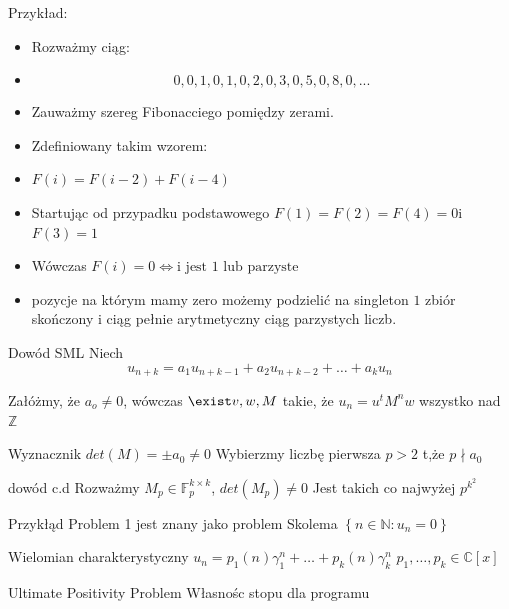 \documentclass{beamer}
\theoremstyle{definition}
\begin{document}
\begin{frame}{Przykład:}
\begin{itemize}
   \item  Rozważmy ciąg: 
   \item  $$ 0, 0, 1, 0, 1, 0, 2, 0, 3, 0, 5, 0, 8, 0, ...$$
    \item      Zauważmy szereg Fibonacciego pomiędzy zerami. 
    \item  Zdefiniowany takim wzorem:
    \item  $F(i) = F(i-2) + F(i-4)$
    \item  Startując od przypadku podstawowego $F(1) = F(2) = F(4) = 0$i $F(3) = 1$
    \item  Wówczas $F(i) = 0 \iff \text{i jest 1 lub parzyste} $  
    \item pozycje na którym mamy zero możemy podzielić na singleton ${1}$ zbiór skończony i ciąg pełnie arytmetyczny ciąg parzystych liczb. 
\end{itemize}
\end{frame}

\begin{frame}{Dowód  SML}
    Niech $$u_{n+k}=a_{1} u_{n+k-1}+a_{2} u_{n+k-2}+\ldots+a_{k} u_{n}$$

    Załóżmy, że $a_o \neq 0$, wówczas $\exist v, w, M$ takie, że 
    $u_n = u^{t} M^{n} w $ wszystko nad $\mathbb{Z}$

    Wyznacznik $det(M) = \pm a_0 \neq 0$
    Wybierzmy liczbę pierwsza $p > 2$ t,że $p \nmid a_0$
\end{frame}

\begin{frame}{dowód c.d}
    Rozważmy $M_p \in \mathbb{F}_p^{k\times k} $, $det(M_p) \neq 0$
    Jest takich co najwyżej $p^{k^{2}}$
\end{frame}

\begin{frame}{Przykłąd}
Problem 1 jest znany jako problem Skolema 
    $\left\{n \in \mathbb{N}: u_{n}=0\right\}$
\end{frame}

\begin{frame}{Wielomian charakterystyczny}
    $u_{n}=p_{1}(n) \gamma_{1}^{n}+\ldots+p_{k}(n) \gamma_{k}^{n}$
    $p_{1}, \ldots, p_{k} \in \mathbb{C}[x]$
\end{frame}

\begin{frame}{Ultimate Positivity Problem}
    Własnośc stopu dla programu

\end{frame}
\end{document}
